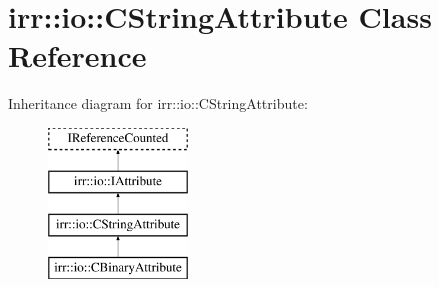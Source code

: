 \hypertarget{classirr_1_1io_1_1_c_string_attribute}{\section{irr\-:\-:io\-:\-:C\-String\-Attribute Class Reference}
\label{classirr_1_1io_1_1_c_string_attribute}
}
Inheritance diagram for irr\-:\-:io\-:\-:C\-String\-Attribute\-:\begin{figure}[H]
\begin{center}
\leavevmode
\includegraphics[height=4.000000cm]{classirr_1_1io_1_1_c_string_attribute}
\end{center}
\end{figure}
